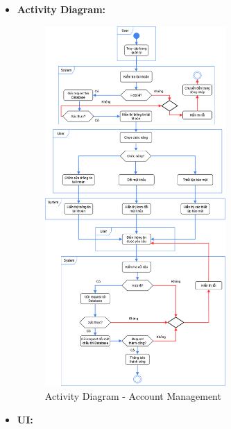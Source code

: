 \documentclass[a4paper]{article}
\begin{document}
\begin{itemize}
	\item \textbf{Activity Diagram:}
	      \begin{figure}[H]
		      \centering
		      \includegraphics[width=0.65\textwidth]{Images/account-management_activity.png}
		      \caption{Activity Diagram - Account Management}
	      \end{figure}
	\item \textbf{UI:}


\end{itemize}
\end{document}
